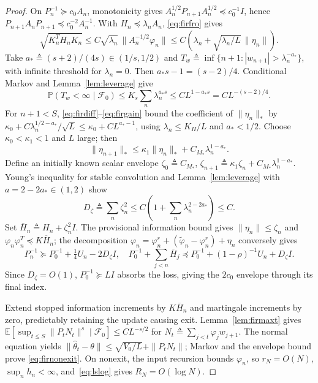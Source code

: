 \documentclass[11pt,reqno]{amsart}
\numberwithin{equation}{section}
\theoremstyle{definition}
\theoremstyle{remark}
\newcommand{\E}{\mathbb E}
\newcommand{\Prob}{\mathbb P}
\newcommand{\F}{\mathcal F}
\newcommand{\thh}{\widehat\theta}
\newcommand{\ph}{\varphi}
\begin{document}
\begin{proof}
On $P_n^{-1}\succeq c_0A_n$, monotonicity gives $A_n^{1/2}P_{n+1}A_n^{1/2}\preceq c_0^{-1}I$, hence $P_{n+1}A_nP_{n+1}\preceq c_0^{-2}A_n^{-1}$. With $H_n\preceq\lambda_nA_n$, \eqref{eq:firfro} gives
\begin{equation}\label{eq:firgain}
 \sqrt{K_n^T H_nK_n}
 \le C\sqrt{\lambda_n}\,\|A_n^{-1/2}\ph_n\|
 \le C\left(\lambda_n+\sqrt{\lambda_n/L}\,\|\eta_n\|\right).
\end{equation}
Take $a_*\triangleq(s+2)/(4s)\in(1/s,1/2)$ and $T_w\triangleq\inf\{n+1:|w_{n+1}|>\lambda_n^{-a_*}\}$, with infinite threshold for $\lambda_n=0$. Then $a_*s-1=(s-2)/4$. Conditional Markov and Lemma~\ref{lem:leverage} give
\[
 \Prob(T_w<\infty\mid\F_0)\le K_s\sum_n\lambda_n^{a_*s}
 \le CL^{1-a_*s}=CL^{-(s-2)/4}.
\]
For $n+1<S$, \eqref{eq:firdiff}--\eqref{eq:firgain} bound the coefficient of $\|\eta_n\|_*$ by $\kappa_0+C\lambda_n^{1/2-a_*}/\sqrt L\le\kappa_0+CL^{a_*-1}$, using $\lambda_n\le K_H/L$ and $a_*<1/2$. Choose $\kappa_0<\kappa_1<1$ and $L$ large; then
\[
 \|\eta_{n+1}\|_*\le\kappa_1\|\eta_n\|_*+C_{M_*}\lambda_n^{1-a_*}.
\]
Define an initially known scalar envelope $\zeta_0\triangleq C_{M_*}$, $\zeta_{n+1}\triangleq\kappa_1\zeta_n+C_{M_*}\lambda_n^{1-a_*}$. Young's inequality for stable convolution and Lemma~\ref{lem:leverage} with $a=2-2a_*\in(1,2)$ show
\begin{equation*}
 D_\zeta\triangleq \sum_n\zeta_n^2\le C(1+\sum_n\lambda_n^{2-2a_*})\le C.
\end{equation*}
Set $\overline H_n\triangleq H_n+\zeta_n^2I$. The provisional information bound gives $\|\eta_n\|\le\zeta_n$ and $\ph_n\ph_n^T\preceq K\overline H_n$; the decomposition $\ph_n=\ph_n^r+(\widetilde\ph_n-\ph_n^r)+\eta_n$ conversely gives
\[
 P_n^{-1}\succeq P_0^{-1}+\tfrac14 U_n-2D_\zeta I,
 \quad P_0^{-1}+\sum_{j<n}\overline H_j\preceq P_0^{-1}+(1-\rho)^{-1}U_n+D_\zeta I.
\]
Since $D_\zeta=O(1)$, $P_0^{-1}\succeq LI$ absorbs the loss, giving the $2c_0$ envelope through its final index.

Extend stopped information increments by $K\overline H_n$ and martingale increments by zero, predictably retaining the update causing exit. Lemma~\ref{lem:firmaxt} gives $\E[\sup_{t\le S}\|P_tN_t\|^s\mid\F_0]\le CL^{-s/2}$ for $N_t\triangleq\sum_{j<t}\ph_jw_{j+1}$. The normal equation yields $\|\thh_t-\theta\|\le\sqrt{V_0/L}+\|P_tN_t\|$; Markov and the envelope bound prove \eqref{eq:firnonexit}. On nonexit, the input recursion bounds $\ph_n$, so $r_N=O(N)$, $\sup_n h_n<\infty$, and~\eqref{eq:lslog} gives $R_N=O(\log N)$.
\end{proof}
\end{document}
